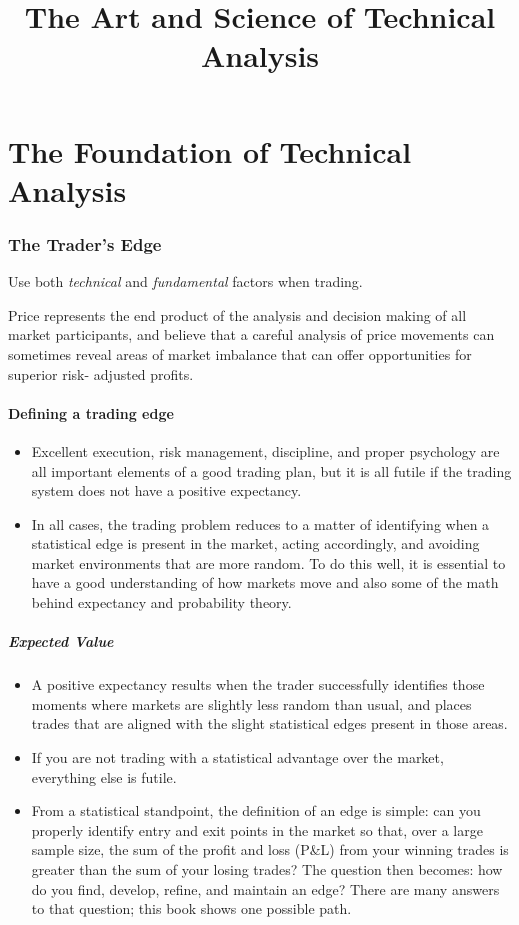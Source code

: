 \documentclass[10pt,twocolumn]{article}
\title{The Art and Science of Technical Analysis}
\begin{document}
\maketitle
\tableofcontents

\part{The Foundation of Technical Analysis}
\section{The Trader's Edge}
Use both \textit{technical} and \textit{fundamental} factors when trading.

Price represents the end product of the analysis and decision making of all market participants, and believe that a careful analysis of price movements can sometimes reveal areas of market imbalance that can offer opportunities for superior risk- adjusted profits.
\subsection{Defining a trading edge}
\begin{itemize}
  \item Excellent execution, risk management, discipline, and proper psychology are all important elements of a good trading plan, but it is all futile if the trading system does not have a positive expectancy.
  \item In all cases, the trading problem reduces to a matter of identifying when a statistical edge is present in the market, acting accordingly, and avoiding market environments that are more random. To do this well, it is essential to have a good understanding of how markets move and also some of the math behind expectancy and probability theory.

\end{itemize}

\subsubsection{Expected Value}
\begin{itemize}
  \item A positive expectancy results when the trader successfully identifies those moments where markets are slightly less random than usual, and places trades that are aligned with the slight statistical edges present in those areas.
  \item If you are not trading with a statistical advantage over the market, everything else is futile.
  \item From a statistical standpoint, the definition of an edge is simple: can you properly identify entry and exit points in the market so that, over a large sample size, the sum of the profit and loss (P\&L) from your winning trades is greater than the sum of your losing trades? The question then becomes: how do you find, develop, refine, and maintain an edge? There are many answers to that question; this book shows one possible path.
\end{itemize}
\end{document}
